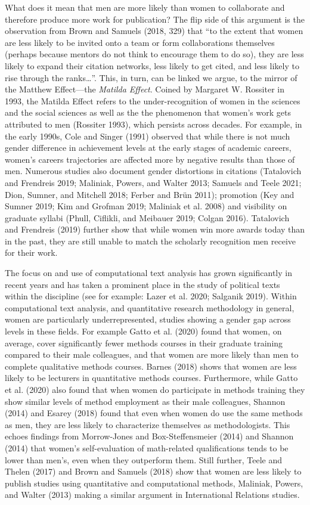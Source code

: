 \documentclass[
]{ccr}
\begin{document}
What does it mean that men are more likely than women to collaborate and
therefore produce more work for publication? The flip side of this
argument is the observation from Brown and Samuels (2018, 329) that ``to
the extent that women are less likely to be invited onto a team or form
collaborations themselves (perhaps because mentors do not think to
encourage them to do so), they are less likely to expand their citation
networks, less likely to get cited, and less likely to rise through the
ranks\ldots{}''. This, in turn, can be linked we argue, to the mirror of
the Matthew Effect---the \emph{Matilda Effect}. Coined by Margaret W.
Rossiter in 1993, the Matilda Effect refers to the under-recognition of
women in the sciences and the social sciences as well as the the
phenomenon that women's work gets attributed to men (Rossiter 1993),
which persists across decades. For example, in the early 1990s, Cole and
Singer (1991) observed that while there is not much gender difference in
achievement levels at the early stages of academic careers, women's
careers trajectories are affected more by negative results than those of
men. Numerous studies also document gender distortions in citations
(Tatalovich and Frendreis 2019; Maliniak, Powers, and Walter 2013;
Samuels and Teele 2021; Dion, Sumner, and Mitchell 2018; Ferber and Brün
2011); promotion (Key and Sumner 2019; Kim and Grofman 2019; Maliniak et
al. 2008) and visibility on graduate syllabi (Phull, Ciflikli, and
Meibauer 2019; Colgan 2016). Tatalovich and Frendreis (2019) further
show that while women win more awards today than in the past, they are
still unable to match the scholarly recognition men receive for their
work.

The focus on and use of computational text analysis has grown
significantly in recent years and has taken a prominent place in the
study of political texts within the discipline (see for example: Lazer
et al. 2020; Salganik 2019). Within computational text analysis, and
quantitative research methodology in general, women are particularly
underrepresented, studies showing a gender gap across levels in these
fields. For example Gatto et al. (2020) found that women, on average,
cover significantly fewer methods courses in their graduate training
compared to their male colleagues, and that women are more likely than
men to complete qualitative methods courses. Barnes (2018) shows that
women are less likely to be lecturers in quantitative methods courses.
Furthermore, while Gatto et al. (2020) also found that when women do
participate in methods training they show similar levels of method
employment as their male colleagues, Shannon (2014) and Esarey (2018)
found that even when women do use the same methods as men, they are less
likely to characterize themselves as methodologists. This echoes
findings from Morrow-Jones and Box-Steffensmeier (2014) and Shannon
(2014) that women's self-evaluation of math-related qualifications tends
to be lower than men's, even when they outperform them. Still further,
Teele and Thelen (2017) and Brown and Samuels (2018) show that women are
less likely to publish studies using quantitative and computational
methods, Maliniak, Powers, and Walter (2013) making a similar argument
in International Relations studies.
\end{document}
